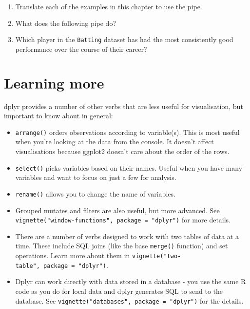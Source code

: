 \begin{enumerate}
\def\labelenumi{\arabic{enumi}.}
\item
  Translate each of the examples in this chapter to use the pipe.
\item
  What does the following pipe do?

\begin{Shaded}
\end{Shaded}
\item
  Which player in the \texttt{Batting} dataset has had the most
  consistently good performance over the course of their career?
\end{enumerate}

\section{Learning more}

dplyr provides a number of other verbs that are less useful for
visualisation, but important to know about in general:

\begin{itemize}
\item
  \texttt{arrange()} orders observations according to variable(s). This
  is most useful when you're looking at the data from the console. It
  doesn't affect visualisations because ggplot2 doesn't care about the
  order of the rows.
\item
  \texttt{select()} picks variables based on their names. Useful when
  you have many variables and want to focus on just a few for analysis.
\item
  \texttt{rename()} allows you to change the name of variables.
\item
  Grouped mutates and filters are also useful, but more advanced. See
  \texttt{vignette("window-functions",\ package\ =\ "dplyr")} for more
  details.
\item
  There are a number of verbs designed to work with two tables of data
  at a time. These include SQL joins (like the base \texttt{merge()}
  function) and set operations. Learn more about them in
  \texttt{vignette("two-table",\ package\ =\ "dplyr")}.
\item
  Dplyr can work directly with data stored in a database - you use the
  same R code as you do for local data and dplyr generates SQL to send
  to the database. See
  \texttt{vignette("databases",\ package\ =\ "dplyr")} for the details.
\end{itemize}

